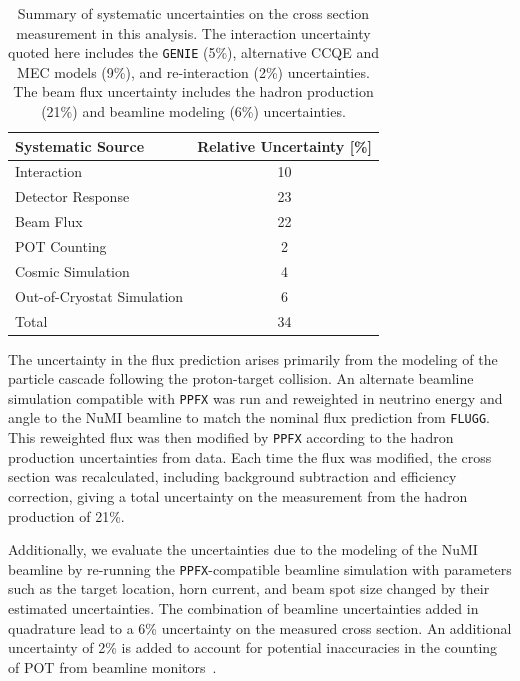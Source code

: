 \documentclass[%
 reprint,
 twocolumn,
superscriptaddress,
showpacs,preprintnumbers,
 amsmath,amssymb,
 aps,
prd,
longbibliography
]{revtex4-1}
\begin{document}
\begin{table}[htb]
\center
\caption{Summary of systematic uncertainties on the cross section measurement in this analysis. The interaction uncertainty quoted here includes the \texttt{GENIE} (5\%), alternative CCQE and MEC models (9\%), and re-interaction (2\%) uncertainties. The beam flux uncertainty includes the hadron production (21\%) and beamline modeling (6\%) uncertainties. }
\label{systematics_table_summary}
\begin{tabular}{l  c}
\hline
\hline
Systematic Source & Relative Uncertainty [\%] \\
\hline
Interaction       & 10  \\
Detector Response & 23  \\
Beam Flux         & 22 \\
POT Counting      & 2   \\
Cosmic Simulation & 4   \\
Out-of-Cryostat Simulation   & 6  \\
\hline
Total & 34\\
\hline
\hline
\end{tabular}
\end{table}

The uncertainty in the flux prediction arises primarily from the modeling of the particle cascade following the proton-target collision. An alternate beamline simulation compatible with \texttt{PPFX} was run and reweighted in neutrino energy and angle to the NuMI beamline to match the nominal flux prediction from \texttt{FLUGG}. This reweighted flux was then modified by \texttt{PPFX} according to the hadron production uncertainties from data. Each time the flux was modified, the cross section was recalculated, including background subtraction and efficiency correction, giving a total uncertainty on the measurement from the hadron production of 21\%.


Additionally, we evaluate the uncertainties due to the modeling of the NuMI beamline by re-running the \texttt{PPFX}-compatible beamline simulation with parameters such as the target location, horn current, and beam spot size changed by their estimated uncertainties.
The combination of beamline uncertainties added in quadrature lead to a 6\% uncertainty on the measured cross section.
An additional uncertainty of 2\% is added to account for potential inaccuracies in the counting of POT from beamline monitors~\cite{2008PhDThesis68P,AliagaSoplin:2016shs}.
\end{document}

